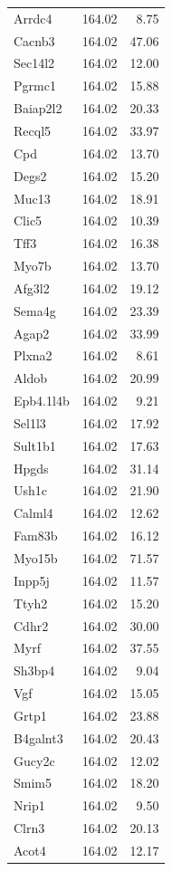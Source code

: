\documentclass[oneside]{book}\usepackage[]{graphicx}\usepackage[]{color}
\begin{document}
\begin{appendices}
{\begin{longtable}{lrr}
  Arrdc4 & 164.02 & 8.75 \\
  Cacnb3 & 164.02 & 47.06 \\
  Sec14l2 & 164.02 & 12.00 \\
  Pgrmc1 & 164.02 & 15.88 \\
  Baiap2l2 & 164.02 & 20.33 \\
  Recql5 & 164.02 & 33.97 \\
  Cpd & 164.02 & 13.70 \\
  Degs2 & 164.02 & 15.20 \\
  Muc13 & 164.02 & 18.91 \\
  Clic5 & 164.02 & 10.39 \\
  Tff3 & 164.02 & 16.38 \\
  Myo7b & 164.02 & 13.70 \\
  Afg3l2 & 164.02 & 19.12 \\
  Sema4g & 164.02 & 23.39 \\
  Agap2 & 164.02 & 33.99 \\
  Plxna2 & 164.02 & 8.61 \\
  Aldob & 164.02 & 20.99 \\
  Epb4.1l4b & 164.02 & 9.21 \\
  Sel1l3 & 164.02 & 17.92 \\
  Sult1b1 & 164.02 & 17.63 \\
  Hpgds & 164.02 & 31.14 \\
  Ush1c & 164.02 & 21.90 \\
  Calml4 & 164.02 & 12.62 \\
  Fam83b & 164.02 & 16.12 \\
  Myo15b & 164.02 & 71.57 \\
  Inpp5j & 164.02 & 11.57 \\
  Ttyh2 & 164.02 & 15.20 \\
  Cdhr2 & 164.02 & 30.00 \\
  Myrf & 164.02 & 37.55 \\
  Sh3bp4 & 164.02 & 9.04 \\
  Vgf & 164.02 & 15.05 \\
  Grtp1 & 164.02 & 23.88 \\
  B4galnt3 & 164.02 & 20.43 \\
  Gucy2c & 164.02 & 12.02 \\
  Smim5 & 164.02 & 18.20 \\
  Nrip1 & 164.02 & 9.50 \\
  Clrn3 & 164.02 & 20.13 \\
  Acot4 & 164.02 & 12.17 \\

\end{longtable}}
\end{appendices}
\end{document}
